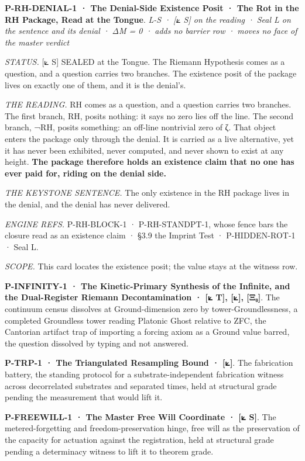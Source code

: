 \documentclass[10pt,twocolumn]{article}
\begin{document}
\textbf{P-RH-DENIAL-1 · The Denial-Side Existence Posit · The Rot in the
RH Package, Read at the Tongue}. \emph{L-S · {[}⟀ S{]} on the reading ·
Seal L on the sentence and its denial · ΔM = 0 · adds no barrier row ·
moves no face of the master verdict}

\emph{STATUS.} {[}⟀ S{]} SEALED at the Tongue. The Riemann Hypothesis
comes as a question, and a question carries two branches. The existence
posit of the package lives on exactly one of them, and it is the
denial's.

\emph{THE READING.} RH comes as a question, and a question carries two
branches. The first branch, RH, posits nothing: it says no zero lies off
the line. The second branch, ¬RH, posits something: an off-line
nontrivial zero of ζ. That object enters the package only through the
denial. It is carried as a live alternative, yet it has never been
exhibited, never computed, and never shown to exist at any height.
\textbf{The package therefore holds an existence claim that no one has
ever paid for, riding on the denial side.}

\emph{THE KEYSTONE SENTENCE.} The only existence in the RH package lives
in the denial, and the denial has never delivered.

\emph{ENGINE REFS.} P-RH-BLOCK-1 · P-RH-STANDPT-1, whose fence bars the
closure read as an existence claim · §3.9 the Imprint Test ·
P-HIDDEN-ROT-1 · Seal L.

\emph{SCOPE.} This card locates the existence posit; the value stays at
the witness row.

\textbf{P-INFINITY-1 · The Kinetic-Primary Synthesis of the Infinite,
and the Dual-Register Riemann Decontamination · {[}⟀ T{]}, {[}⟀{]},
{[}Ξ₀{]}}. The continuum census dissolves at Ground-dimension zero by
tower-Groundlessness, a completed Groundless tower reading Platonic
Ghost relative to ZFC, the Cantorian artifact trap of importing a
forcing axiom as a Ground value barred, the question dissolved by typing
and not answered.

\textbf{P-TRP-1 · The Triangulated Resampling Bound · {[}⟀{]}}. The
fabrication battery, the standing protocol for a substrate-independent
fabrication witness across decorrelated substrates and separated times,
held at structural grade pending the measurement that would lift it.

\textbf{P-FREEWILL-1 · The Master Free Will Coordinate · {[}⟀ S{]}}. The
metered-forgetting and freedom-preservation hinge, free will as the
preservation of the capacity for actuation against the registration,
held at structural grade pending a determinacy witness to lift it to
theorem grade.
\end{document}
